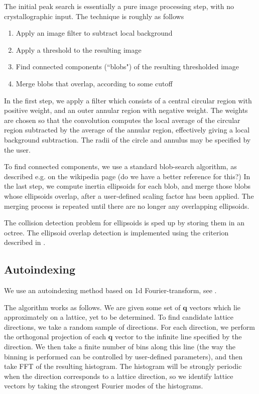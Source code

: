 \documentclass[11pt,a4paper]{article}
\newcommand{\bq}{\mathbf{q}}
\begin{document}
The initial peak search is essentially a pure image processing step, with no crystallographic
input. The technique is roughly as follows
\begin{enumerate}
  \item Apply an image filter to subtract local background
  \item Apply a threshold to the resulting image
  \item Find connected components (``blobs") of the resulting thresholded image
  \item Merge blobs that overlap, according to some cutoff
\end{enumerate}

In the first step, we apply a filter which consists of a central circular region with positive weight,
and an outer annular region with negative weight. The weights are chosen so that the convolution
computes the local average of the circular region subtracted by the average of the annular region,
effectively giving a local background subtraction. The radii of the circle and annulus may be
specified by the user.

To find connected components, we use a standard blob-search algorithm, as described e.g. on the
wikipedia page (do we have a better reference for this?) In the last step, we compute inertia
ellipsoids for each blob, and merge those blobs whose ellipsoids overlap, after a user-defined
scaling factor has been applied. The merging process is repeated until there are no longer any
overlapping ellipsoids.

The collision detection problem for ellipsoids is sped up by storing them in an octree. The
ellipsoid overlap detection is implemented using the criterion described in \cite{ellipsoid-collision}.


\subsection{Autoindexing} \label{autoindex}

We use an autoindexing method based on 1d Fourier-transform, see \cite{StBR97,SaGA04}.

The algorithm works as follows. We are given some set of $\bq$ vectors which lie approximately on
a lattice, yet to be determined. To find candidate lattice directions, we take a random sample of
directions. For each direction, we perform the orthogonal projection of each $\bq$ vector to the
infinite line specified by the direction. We then take a finite number of bins along this line
(the way the binning is performed can be controlled by user-defined parameters), and then take
FFT of the resulting histogram. The histogram will be strongly periodic when the direction corresponds
to a lattice direction, so we identify lattice vectors by taking the strongest Fourier modes of
the histograms.
\end{document}
